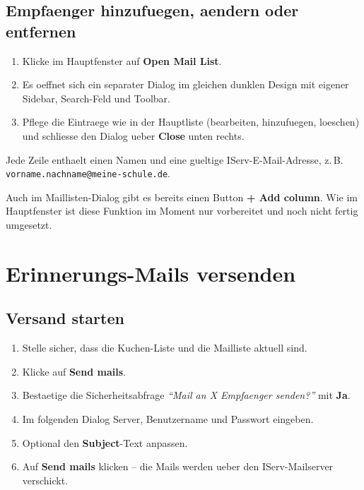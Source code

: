\documentclass[12pt, a4paper]{article}
\begin{document}
\subsection{Empfaenger hinzufuegen, aendern oder entfernen}

\begin{stepbox}
\begin{enumerate}[leftmargin=1.5em]
    \item Klicke im Hauptfenster auf \textbf{Open Mail List}.
    \item Es oeffnet sich ein separater Dialog im gleichen dunklen Design mit
          eigener Sidebar, Search-Feld und Toolbar.
    \item Pflege die Eintraege wie in der Hauptliste (bearbeiten, hinzufuegen,
          loeschen) und schliesse den Dialog ueber \textbf{Close} unten rechts.
\end{enumerate}
\end{stepbox}

\begin{infobox}[Empfaengerformat]
Jede Zeile enthaelt einen Namen und eine gueltige IServ-E-Mail-Adresse, z.\,B.
\texttt{vorname.nachname@meine-schule.de}.
\end{infobox}

\begin{warnbox}
Auch im Maillisten-Dialog gibt es bereits einen Button \textbf{+ Add column}.
Wie im Hauptfenster ist diese Funktion im Moment nur vorbereitet und noch nicht
fertig umgesetzt.
\end{warnbox}

\section{Erinnerungs-Mails versenden}

\subsection{Versand starten}

\begin{stepbox}
\begin{enumerate}[leftmargin=1.5em]
    \item Stelle sicher, dass die Kuchen-Liste und die Mailliste aktuell sind.
    \item Klicke auf \textbf{Send mails}.
    \item Bestaetige die Sicherheitsabfrage \emph{"`Mail an X Empfaenger
          senden?"'} mit \textbf{Ja}.
    \item Im folgenden Dialog Server, Benutzername und Passwort eingeben.
    \item Optional den \textbf{Subject}-Text anpassen.
    \item Auf \textbf{Send mails} klicken -- die Mails werden ueber den
          IServ-Mailserver verschickt.
\end{enumerate}
\end{stepbox}
\end{document}
